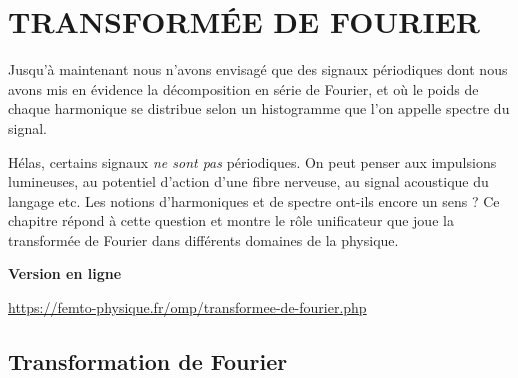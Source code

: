 \setchapterpreamble[u]{\margintoc}
\chapter{TRANSFORMÉE DE FOURIER}

Jusqu'à maintenant nous n'avons envisagé que des signaux périodiques dont nous avons mis en évidence la décomposition en série de Fourier, et où le poids de chaque harmonique se distribue selon un histogramme que l'on appelle spectre du signal. 

Hélas, certains signaux \emph{ne sont pas} périodiques. On peut penser aux impulsions lumineuses, au potentiel d'action d'une fibre nerveuse, au signal acoustique du langage etc. Les notions d'harmoniques et de spectre ont-ils encore un sens ? Ce chapitre répond à cette question et montre le rôle unificateur que joue la transformée de Fourier dans différents domaines de la physique.

\begin{center}
\textbf{Version en ligne}

	\url{https://femto-physique.fr/omp/transformee-de-fourier.php}
\end{center}

\section{Transformation de Fourier} %
\label{sec:transformee_de_fourier}

